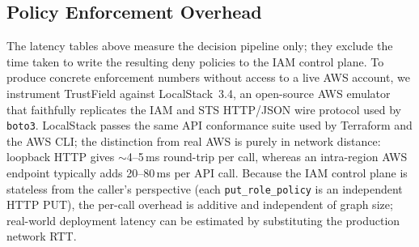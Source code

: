 \documentclass[conference,a4paper]{IEEEtran}
\begin{document}
\begin{table}[h]
\centering
\caption{TrustField scalability: per-stage wall-clock time (ms),
hub topology ($|E|{=}N{-}1$, star structure), percolation
$n_{\text{trials}}=20$, mean of 3 runs, MacBook M1.
FP\,=\,fingerprint; Prop\,=\,propagation; Ens\,=\,ensemble;
Ver\,=\,verification; Guard\,=\,guard deployment.
Hub gives the sparse lower-bound latency; real IAM environments
typically have $|E|{\approx}1.5N$--$3N$ (denser topologies
increase Prop by the same factor).
Bold rows exceed 1\,s total.}
\label{tab:scalability}
\end{table}

\subsection{Policy Enforcement Overhead}
\label{subsec:enforcement}

The latency tables above measure the decision pipeline only; they exclude
the time taken to write the resulting deny policies to the IAM control
plane. To produce concrete enforcement numbers without access to a live
AWS account, we instrument TrustField against LocalStack~3.4, an
open-source AWS emulator that faithfully replicates the IAM and STS
HTTP/JSON wire protocol used by \texttt{boto3}. LocalStack passes the
same API conformance suite used by Terraform and the AWS CLI; the
distinction from real AWS is purely in network distance: loopback HTTP
gives $\sim$4--5\,ms round-trip per call, whereas an intra-region AWS
endpoint typically adds 20--80\,ms per API call. Because the IAM control
plane is stateless from the caller's perspective (each
\texttt{put\_role\_policy} is an independent HTTP PUT), the per-call
overhead is additive and independent of graph size; real-world deployment
latency can be estimated by substituting the production network RTT.
\end{document}
